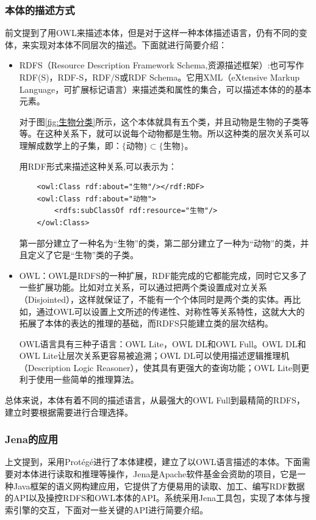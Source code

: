 \documentclass[12pt,a4paper]{article}
\begin{document}
		\subsubsection{本体的描述方式}
	前文提到了用OWL来描述本体，但是对于这样一种本体描述语言，仍有不同的变体，来实现对本体不同层次的描述。下面就进行简要介绍：
	\begin{itemize}
		\item
	RDFS（Resource Description Framework Schema,资源描述框架）:也可写作RDF(S)，RDF-S，RDF/S或RDF Schema。它用XML（eXtensive Markup Language，可扩展标记语言）来描述类和属性的集合，可以描述本体的的基本元素。
	
	对于图\ref{fig:生物分类}所示，这个本体就具有五个类，并且动物是生物的子类等等。在这种关系下，就可以说每个动物都是生物。所以这种类的层次关系可以理解成数学上的子集，即：$ \{动物\} \subset \{生物\} $。
	
	用RDF形式来描述这种关系,可以表示为：
	\lstset{language=XML,frame=lines}
	\begin{lstlisting}
	<owl:Class rdf:about="生物"/></rdf:RDF>
	<owl:Class rdf:about="动物">
		<rdfs:subClassOf rdf:resource="生物"/>
	</owl:Class>
	\end{lstlisting}
	第一部分建立了一种名为“生物”的类，第二部分建立了一种为“动物”的类，并且定义了它是“生物”类的子类。
		\item
	OWL：OWL是RDFS的一种扩展，RDF能完成的它都能完成，同时它又多了一些扩展功能。比如对立关系，可以通过把两个类设置成对立关系（Disjointed），这样就保证了，不能有一个个体同时是两个类的实体。再比如，通过OWL可以设置上文所述的传递性、对称性等关系特性，这就大大的拓展了本体的表达的推理的基础，而RDFS只能建立类的层次结构。
	
	OWL语言具有三种子语言：OWL Lite，OWL DL和OWL Full。OWL DL和OWL Lite让层次关系更容易被追溯；OWL DL可以使用描述逻辑推理机（Description Logic Reasoner），使其具有更强大的查询功能；OWL Lite则更利于使用一些简单的推理算法。

	\end{itemize}
	
	总体来说，本体有着不同的描述语言，从最强大的OWL Full到最精简的RDFS，建立时要根据需要进行合理选择。
		
		\subsubsection{Jena的应用}
	上文提到，采用Prot{\'e}g{\'e}进行了本体建模，建立了以OWL语言描述的本体。下面需要对本体进行读取和推理等操作，Jena是Apache软件基金会资助的项目，它是一种Java框架的语义网构建应用，它提供了方便易用的读取、加工、编写RDF数据的API以及操控RDFS和OWL本体的API。系统采用Jena工具包，实现了本体与搜索引擎的交互，下面对一些关键的API进行简要介绍。
\end{document}
